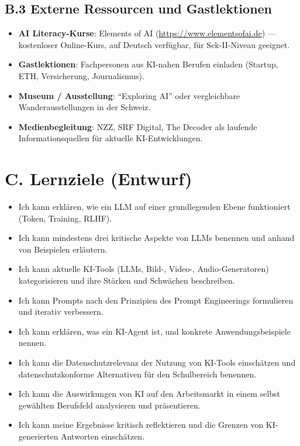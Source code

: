 \subsection*{B.3 Externe Ressourcen und Gastlektionen}

\begin{itemize}
    \item \textbf{AI Literacy-Kurse}: Elements of AI (\url{https://www.elementsofai.de})
          --- kostenloser Online-Kurs, auf Deutsch verfügbar, für Sek-II-Niveau geeignet.
    \item \textbf{Gastlektionen}: Fachpersonen aus KI-nahen Berufen einladen
          (Startup, ETH, Versicherung, Journalismus).
    \item \textbf{Museum / Ausstellung}: \enquote{Exploring AI} oder vergleichbare
          Wanderausstellungen in der Schweiz.
    \item \textbf{Medienbegleitung}: NZZ, SRF Digital, The Decoder als laufende
          Informationsquellen für aktuelle KI-Entwicklungen.
\end{itemize}

\section*{C. Lernziele (Entwurf)}

\begin{itemize}
    \item Ich kann erklären, wie ein LLM auf einer grundlegenden Ebene funktioniert
          (Token, Training, RLHF).
    \item Ich kann mindestens drei kritische Aspekte von LLMs benennen und anhand
          von Beispielen erläutern.
    \item Ich kann aktuelle KI-Tools (LLMs, Bild-, Video-, Audio-Generatoren)
          kategorisieren und ihre Stärken und Schwächen beschreiben.
    \item Ich kann Prompts nach den Prinzipien des Prompt Engineerings formulieren
          und iterativ verbessern.
    \item Ich kann erklären, was ein KI-Agent ist, und konkrete Anwendungsbeispiele
          nennen.
    \item Ich kann die Datenschutzrelevanz der Nutzung von KI-Tools einschätzen
          und datenschutzkonforme Alternativen für den Schulbereich benennen.
    \item Ich kann die Auswirkungen von KI auf den Arbeitsmarkt in einem selbst
          gewählten Berufsfeld analysieren und präsentieren.
    \item Ich kann meine Ergebnisse kritisch reflektieren und die Grenzen
          von KI-generierten Antworten einschätzen.
\end{itemize}

